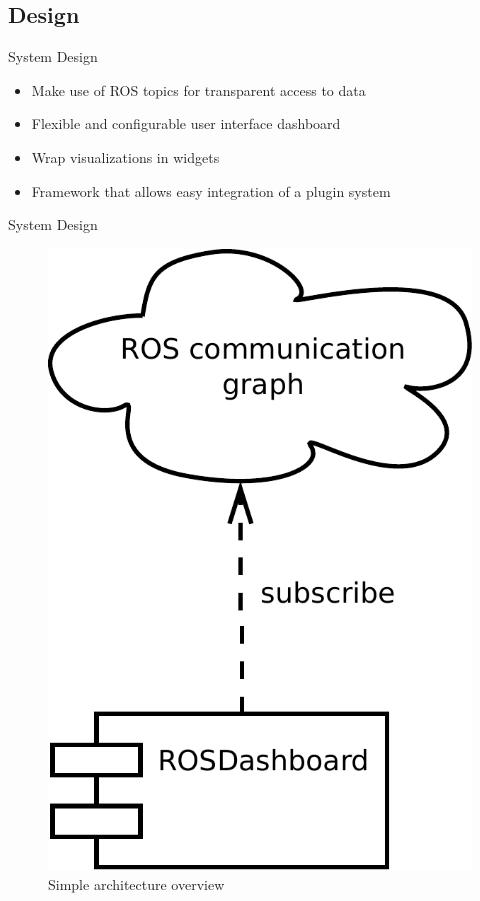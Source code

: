\documentclass[compress]{beamer}
\begin{document}
\subsection{Design}

\begin{frame}{System Design}
\begin{itemize}
\item Make use of ROS topics for transparent access to data
\item Flexible and configurable user interface dashboard
\item Wrap visualizations in widgets
\item Framework that allows easy integration of a plugin system
\end{itemize}
\end{frame}

\begin{frame}{System Design}
\begin{figure}[t]
    \centering
    \includegraphics[height=.7\textheight]{diagrams/simple_architecture_overview}
		\caption{Simple architecture overview}
\end{figure}
\end{frame}
\end{document}
